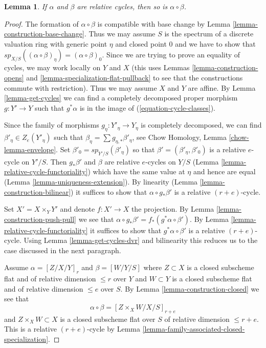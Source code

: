 \documentclass{stacks-project}
\theoremstyle{plain}
\newtheorem{lemma}[subsection]{Lemma}
\theoremstyle{definition}
\theoremstyle{remark}
\numberwithin{equation}{subsection}
\begin{document}
\begin{lemma}
\label{lemma-well-defined}
If $\alpha$ and $\beta$ are relative cycles, then so is $\alpha \circ \beta$.
\end{lemma}

\begin{proof}
The formation of $\alpha \circ \beta$ is compatible with base change
by Lemma \ref{lemma-construction-base-change}. Thus we may assume
$S$ is the spectrum of a discrete valuation ring with generic point
$\eta$ and closed point $0$ and we have to show that
$sp_{X/S}((\alpha \circ \beta)_\eta) = (\alpha \circ \beta)_0$.
Since we are trying to prove an equality of cycles, we may
work locally on $Y$ and $X$ (this uses
Lemmas \ref{lemma-construction-opens} and
\ref{lemma-specialization-flat-pullback}
to see that the constructions commute with restriction).
Thus we may assume $X$ and $Y$ are affine.
By Lemma \ref{lemma-get-cycles}
we can find a completely decomposed proper morphism
$g : Y' \to Y$ such that $g^*\alpha$ is in the image of
(\ref{equation-cycle-classes}).

\medskip\noindent
Since the family of morphisms $g_\eta : Y'_\eta \to Y_\eta$
is completely decomposed, we can find $\beta'_\eta \in Z_e(Y'_\eta)$ such that
$\beta_\eta = \sum g_{\eta, *}\beta'_\eta$, see
Chow Homology, Lemma \ref{chow-lemma-envelope}.
Set $\beta'_0 = sp_{Y'/S}(\beta'_\eta)$ so that
$\beta' = (\beta'_\eta, \beta'_0)$ is a relative $e$-cycle on $Y'/S$. Then
$g_*\beta'$ and $\beta$ are relative $e$-cycles
on $Y/S$ (Lemma \ref{lemma-relative-cycle-functoriality})
which have the same value at $\eta$ and hence are equal
(Lemma \ref{lemma-uniqueness-extension}). By linearity
(Lemma \ref{lemma-construction-bilinear})
it suffices to show that $\alpha \circ g_*\beta'$
is a relative $(r + e)$-cycle.

\medskip\noindent
Set $X' = X \times_Y Y'$ and denote $f : X' \to X$ the projection.
By Lemma \ref{lemma-construction-push-pull} we see that
$\alpha \circ g_*\beta' = f_*(g^*\alpha \circ \beta')$.
By Lemma \ref{lemma-relative-cycle-functoriality}
it suffices to show that $g^*\alpha \circ \beta'$
is a relative $(r + e)$-cycle. Using Lemma \ref{lemma-get-cycles-dvr}
and bilinearity this reduces us to the case discussed in the next paragraph.

\medskip\noindent
Assume $\alpha = [Z/X/Y]_r$ and $\beta = [W/Y/S]$
where $Z \subset X$ is a closed subscheme flat and of relative
dimension $\leq r$ over $Y$ and $W \subset Y$ is a closed
subscheme flat and of relative dimension $\leq e$ over $S$.
By Lemma \ref{lemma-construction-closed} we see that
$$
\alpha \circ \beta = [Z \times_X W/X/S]_{r + e}
$$
and $Z \times_X W \subset X$ is a closed subscheme flat over $S$
of relative dimension $\leq r + e$. This is a relative $(r + e)$-cycle by
Lemma \ref{lemma-family-associated-closed-specialization}.
\end{proof}
\end{document}
